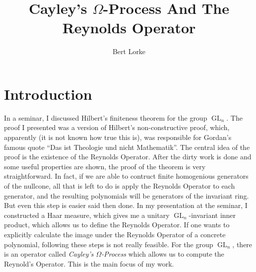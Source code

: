 \documentclass{article}
\title{Cayley's $\Omega$-Process And The Reynolds Operator}
\author{Bert Lorke}
\theoremstyle{prrt}
\begin{document}


\maketitle

\section{Introduction}

In a seminar, I discussed Hilbert's finiteness theorem for the group $\operatorname{GL}_n$.
The proof I presented was a version of Hilbert's non-constructive proof, which, apparently (it is not known how true this is), was responsible for Gordan's famous quote ``Das ist Theologie und nicht Mathematik''.
The central idea of the proof is the existence of the Reynolds Operator.
After the dirty work is done and some useful properties are shown, the proof of the theorem is very straightforward.
In fact, if we are able to contruct finite homogenious generators of the nullcone, all that is left to do is apply the Reynolds Operator to each generator, and the resulting polynomials will be generators of the invariant ring.
But even this step is easier said then done.
In my presentation at the seminar, I constructed a Haar measure, which gives me a unitary $\operatorname{GL}_n$-invariant inner product, which allows us to define the Reynolds Operator. If one wants to explicitly calculate the image under the Reynolds Operator of a concrete polynomial, following these steps is not really feasible.
For the group $\operatorname{GL}_n$, there is an operator called \textit{Cayley's $\Omega$-Process} which allows us to compute the Reynold's Operator.
This is the main focus of my work.


% 
\end{document}
